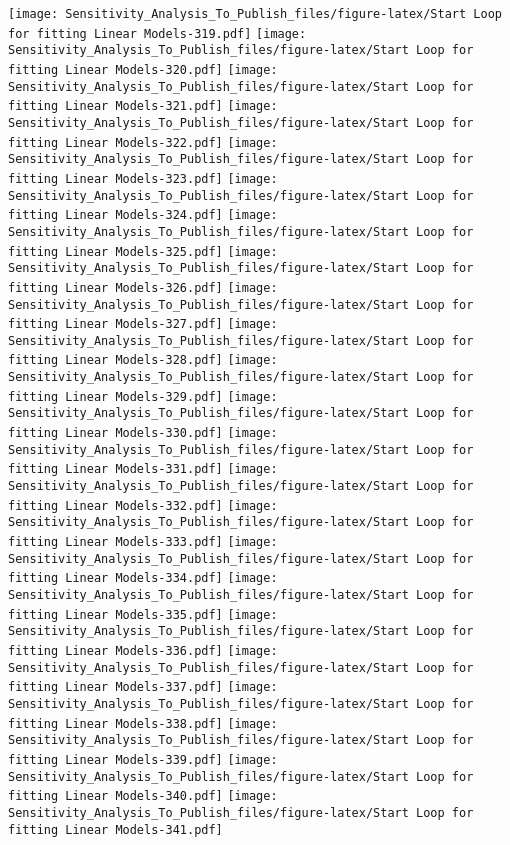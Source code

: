 \documentclass[
]{article}
\begin{document}
\texttt{[image: Sensitivity\_Analysis\_To\_Publish\_files/figure-latex/Start Loop for fitting Linear Models-319.pdf]}
\texttt{[image: Sensitivity\_Analysis\_To\_Publish\_files/figure-latex/Start Loop for fitting Linear Models-320.pdf]}
\texttt{[image: Sensitivity\_Analysis\_To\_Publish\_files/figure-latex/Start Loop for fitting Linear Models-321.pdf]}
\texttt{[image: Sensitivity\_Analysis\_To\_Publish\_files/figure-latex/Start Loop for fitting Linear Models-322.pdf]}
\texttt{[image: Sensitivity\_Analysis\_To\_Publish\_files/figure-latex/Start Loop for fitting Linear Models-323.pdf]}
\texttt{[image: Sensitivity\_Analysis\_To\_Publish\_files/figure-latex/Start Loop for fitting Linear Models-324.pdf]}
\texttt{[image: Sensitivity\_Analysis\_To\_Publish\_files/figure-latex/Start Loop for fitting Linear Models-325.pdf]}
\texttt{[image: Sensitivity\_Analysis\_To\_Publish\_files/figure-latex/Start Loop for fitting Linear Models-326.pdf]}
\texttt{[image: Sensitivity\_Analysis\_To\_Publish\_files/figure-latex/Start Loop for fitting Linear Models-327.pdf]}
\texttt{[image: Sensitivity\_Analysis\_To\_Publish\_files/figure-latex/Start Loop for fitting Linear Models-328.pdf]}
\texttt{[image: Sensitivity\_Analysis\_To\_Publish\_files/figure-latex/Start Loop for fitting Linear Models-329.pdf]}
\texttt{[image: Sensitivity\_Analysis\_To\_Publish\_files/figure-latex/Start Loop for fitting Linear Models-330.pdf]}
\texttt{[image: Sensitivity\_Analysis\_To\_Publish\_files/figure-latex/Start Loop for fitting Linear Models-331.pdf]}
\texttt{[image: Sensitivity\_Analysis\_To\_Publish\_files/figure-latex/Start Loop for fitting Linear Models-332.pdf]}
\texttt{[image: Sensitivity\_Analysis\_To\_Publish\_files/figure-latex/Start Loop for fitting Linear Models-333.pdf]}
\texttt{[image: Sensitivity\_Analysis\_To\_Publish\_files/figure-latex/Start Loop for fitting Linear Models-334.pdf]}
\texttt{[image: Sensitivity\_Analysis\_To\_Publish\_files/figure-latex/Start Loop for fitting Linear Models-335.pdf]}
\texttt{[image: Sensitivity\_Analysis\_To\_Publish\_files/figure-latex/Start Loop for fitting Linear Models-336.pdf]}
\texttt{[image: Sensitivity\_Analysis\_To\_Publish\_files/figure-latex/Start Loop for fitting Linear Models-337.pdf]}
\texttt{[image: Sensitivity\_Analysis\_To\_Publish\_files/figure-latex/Start Loop for fitting Linear Models-338.pdf]}
\texttt{[image: Sensitivity\_Analysis\_To\_Publish\_files/figure-latex/Start Loop for fitting Linear Models-339.pdf]}
\texttt{[image: Sensitivity\_Analysis\_To\_Publish\_files/figure-latex/Start Loop for fitting Linear Models-340.pdf]}
\texttt{[image: Sensitivity\_Analysis\_To\_Publish\_files/figure-latex/Start Loop for fitting Linear Models-341.pdf]}
\end{document}
